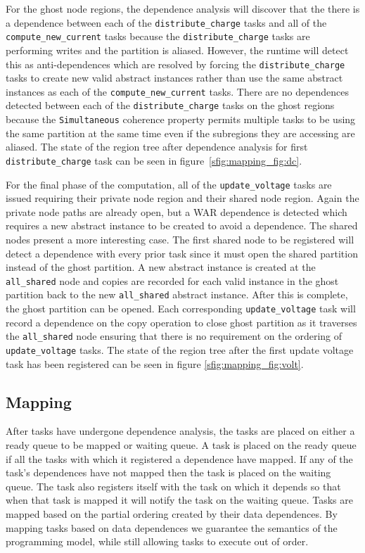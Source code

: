 For the ghost node regions, the dependence analysis will discover that the
there is a dependence between each of the {\tt distribute\_charge} tasks and all of the
{\tt compute\_new\_current} tasks because the {\tt distribute\_charge} tasks are
performing writes and the partition is aliased.  However, the runtime will detect this as
anti-dependences which are resolved by forcing the {\tt distribute\_charge} tasks to
create new valid abstract instances rather than use the same abstract instances as
each of the {\tt compute\_new\_current} tasks.  There are no dependences detected
between each of the {\tt distribute\_charge} tasks on the ghost regions because
the {\tt Simultaneous} coherence property permits multiple tasks to be using the same
partition at the same time even if the subregions they are accessing are aliased.  The
state of the region tree after dependence analysis for first {\tt distribute\_charge} task can
be seen in figure~\ref{sfig:mapping_fig:dc}.

For the final phase of the computation, all of the {\tt update\_voltage} tasks
are issued requiring their private node region and their shared node region.  Again
the private node paths are already open, but a WAR dependence is detected which
requires a new abstract instance to be created to avoid a dependence.  The
shared nodes present a more interesting case.  The first shared node to be registered
will detect a dependence with every prior task since it must open the shared partition
instead of the ghost partition.  A new abstract instance is created at the 
{\tt all\_shared} node and copies are recorded for each valid instance in the ghost partition
back to the new {\tt all\_shared} abstract instance.  After this is complete, the
ghost partition can be opened.  Each corresponding {\tt update\_voltage} task will record
a dependence on the copy operation to close ghost partition as it traverses the {\tt all\_shared}
node ensuring that there is no requirement on the ordering of {\tt update\_voltage}
tasks.  The state of the region tree after the first update voltage task
has been registered can be seen in figure \ref{sfig:mapping_fig:volt}.

\subsection{Mapping}
\label{subsec:mapping}
After tasks have undergone dependence analysis, the tasks are placed on either a ready
queue to be mapped or waiting queue.  A task is placed on the ready queue if all the tasks with
which it registered a dependence have mapped.  If any of the task's dependences have
not mapped then the task is placed on the waiting queue.  The task also registers
itself with the task on which it depends so that when that task is mapped it will notify
the task on the waiting queue. Tasks are mapped based on the partial ordering created by 
their data dependences.  By mapping tasks based on data dependences we guarantee the 
semantics of the programming model, while still allowing tasks to execute out of order.

